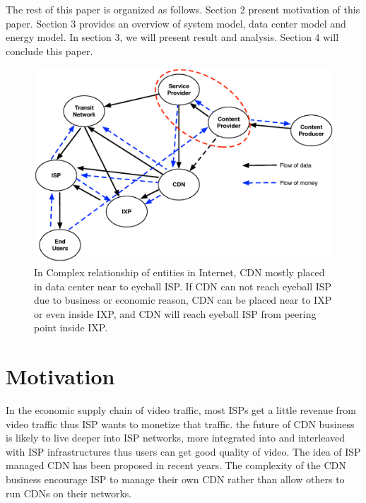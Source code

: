 \documentclass[conference]{IEEEtran}
\begin{document}
The rest of this paper is organized as follows. 
Section 2 present motivation of this paper.
Section 3 provides an overview of system model, data center model and energy model.  
In section 3, we will present result and analysis.  
Section 4 will conclude this paper. 

\begin{figure}[tb]
\begin{center}
\includegraphics[scale=0.4]{graphs/business-relationship.eps}
\end{center}
\caption{In Complex relationship of entities in Internet, 
CDN mostly placed in data center near to eyeball ISP. 
If CDN can not reach eyeball ISP due to business or economic reason, CDN can be placed near to IXP or even inside IXP, and CDN will reach eyeball ISP from peering point inside IXP.}
\label{fig:businessrelationship}
\end{figure} 

\section{Motivation}\label{motivation}
In the economic supply chain of video traffic, most ISPs get a little revenue from video traffic thus ISP wants to monetize that traffic.
the future of CDN business is likely to live deeper into ISP networks, more integrated into and interleaved with ISP infrastructures thus users can get good quality of video.
The idea of ISP managed CDN has been proposed in recent years.
The complexity of the CDN business encourage ISP to manage their own CDN rather than allow others to run CDNs on their networks.
\end{document}
